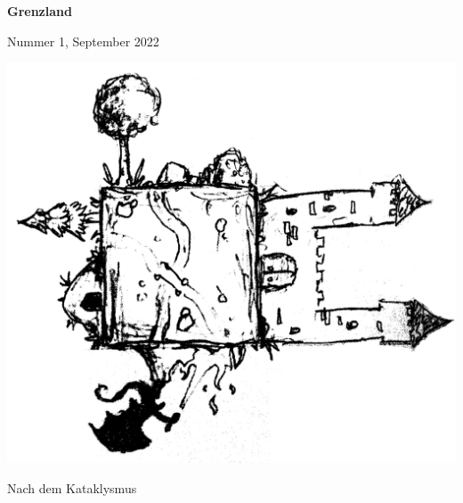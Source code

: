 \documentclass[11pt]{wbzine}
\begin{document}
\begin{titlepage}
\centering
{\bfseries\fontsize{70}{55}\selectfont Grenzland}

\hrulefill Nummer 1, September 2022
    \vspace{1cm}

	  \includegraphics[width=\textwidth]{Coverimage.png}

    \vspace{1cm}
{\Huge Nach dem Kataklysmus\par}%

\end{titlepage}

\tableofcontents
\end{document}
